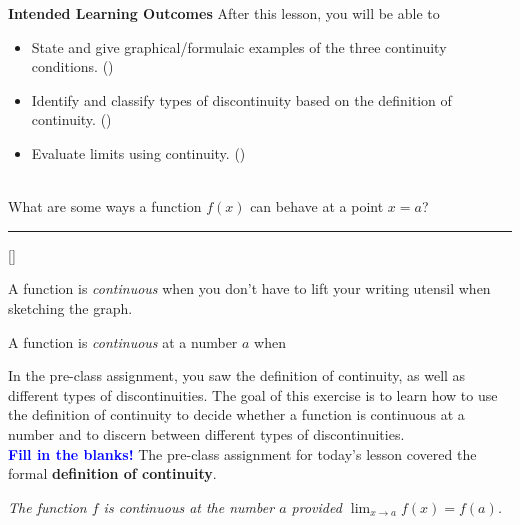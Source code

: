 \documentclass[10pt]{article}
\begin{document}
\thispagestyle{firstpage}
\pagestyle{otherpages}

\textbf{Intended Learning Outcomes}
After this lesson, you will be able to 

\begin{itemize}
    \item State and give graphical/formulaic examples of the three continuity conditions. ()
    \item Identify and classify types of discontinuity based on the definition of continuity. ()
    \item Evaluate limits using continuity. ()
\end{itemize}

\vspace{-0.5cm}

\hrulefill\\
{\bf {}} What are some ways a function $f(x)$ can behave at a point $x=a$? 

\vfill

\hrule
\vspace{0.5cm}
[]{
\begin{center}{\bf {}} \end{center}
A function is {\em continuous} when you don't have to lift your writing utensil when sketching the graph.
\vspace{2cm}
}{
\begin{center}{\bf {}} \end{center}
A function is {\em continuous} at a number $a$  when 
}
\newpage

In the pre-class assignment, you saw the definition of continuity, as well as different types of discontinuities. The goal of this exercise is to learn how to use the definition of continuity to decide whether a function is continuous at a number and to discern between different types of discontinuities.\\

{\bf \textcolor{blue}{Fill in the blanks!}} The pre-class assignment for today's lesson covered the formal {\bf definition of continuity}. 
\begin{center}
{\it The function $f$ is continuous at the number $a$ provided $\displaystyle\lim_{x\to a} f(x)=f(a)$.} \\ %
\end{center}

\bigskip
\end{document}
